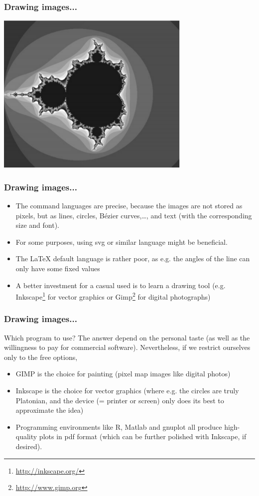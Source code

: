 \documentclass[13pt]{beamer}
\begin{document}
\begin{frame}[fragile]\frametitle{Drawing images...}
\begin{center}
\includegraphics[width=0.7\textwidth]{img/mandelbrot}
\end{center}
\end{frame}


\begin{frame}[fragile]\frametitle{Drawing images...}
\begin{itemize}
\item The command languages are precise, because the images are not stored as
pixels, but as lines, circles, B\'ezier curves,\ldots, and text (with the
corresponding size and font).
\item For some purposes, using svg or similar language might be beneficial.
\item The LaTeX default language is rather poor, as e.g. the angles of the line
can only have some fixed values
\item A better investment for a casual used is to learn a drawing tool (e.g.
Inkscape\footnote{\url{http://inkscape.org/}} for vector graphics or
Gimp\footnote{\url{http://www.gimp.org}} for digital photographs)
\end{itemize}
\end{frame}


\begin{frame}[fragile]\frametitle{Drawing images...}
Which program to use? The answer depend on the personal taste (as well as the
willingness to pay for commercial software). Nevertheless, if we restrict
ourselves only to the free options, 

\begin{itemize}
\item GIMP is the choice for painting (pixel map images like digital photos)
\item Inkscape is the choice for vector graphics (where e.g. the circles are
truly Platonian, and the device (= printer or screen) only does its best to
approximate the idea)
\item Programming environments like R, Matlab and gnuplot all produce
high-quality plots in pdf format (which can be further polished with Inkscape,
if desired).
\end{itemize}
\end{frame}
\end{document}
